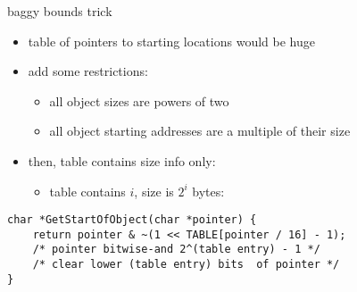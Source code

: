 
\begin{frame}[fragile,label=baggyBoundsTrick]{baggy bounds trick}
\lstset{language=C,style=small}
    \begin{itemize}
        \item table of pointers to starting locations would be huge
        \item add some restrictions:
            \begin{itemize}
            \item all object sizes are powers of two
            \item all object starting addresses are a multiple of their size
            \end{itemize}
        \item then, table contains size info only:
            \begin{itemize}
            \item table contains $i$, size is $2^i$ bytes:
            \end{itemize}
    \end{itemize}
\begin{lstlisting}
char *GetStartOfObject(char *pointer) {
    return pointer & ~(1 << TABLE[pointer / 16] - 1);
    /* pointer bitwise-and 2^(table entry) - 1 */
    /* clear lower (table entry) bits  of pointer */
}
\end{lstlisting}
\end{frame}

